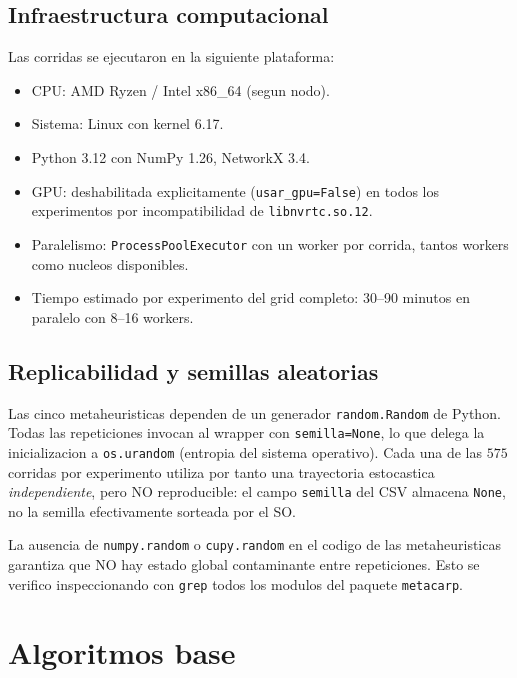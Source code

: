 \subsection{Infraestructura computacional}
\label{sec:infra}

Las corridas se ejecutaron en la siguiente plataforma:
\begin{itemize}
\item CPU: AMD Ryzen / Intel x86\_64 (segun nodo).
\item Sistema: Linux con kernel 6.17.
\item Python 3.12 con NumPy 1.26, NetworkX 3.4.
\item GPU: deshabilitada explicitamente (\texttt{usar\_gpu=False}) en
  todos los experimentos por incompatibilidad de \texttt{libnvrtc.so.12}.
\item Paralelismo: \texttt{ProcessPoolExecutor} con un worker por
  corrida, tantos workers como nucleos disponibles.
\item Tiempo estimado por experimento del grid completo: 30--90
  minutos en paralelo con 8--16 workers.
\end{itemize}

\subsection{Replicabilidad y semillas aleatorias}
\label{sec:semillas}

Las cinco metaheuristicas dependen de un generador \texttt{random.Random}
de Python. Todas las repeticiones invocan al wrapper con
\texttt{semilla=None}, lo que delega la inicializacion a
\texttt{os.urandom} (entropia del sistema operativo). Cada una de las
$575$ corridas por experimento utiliza por tanto una trayectoria
estocastica \emph{independiente}, pero NO reproducible: el campo
\texttt{semilla} del CSV almacena \texttt{None}, no la semilla
efectivamente sorteada por el SO.

La ausencia de \texttt{numpy.random} o \texttt{cupy.random} en el
codigo de las metaheuristicas garantiza que NO hay estado global
contaminante entre repeticiones. Esto se verifico inspeccionando con
\texttt{grep} todos los modulos del paquete \texttt{metacarp}.

\section{Algoritmos base}
\label{sec:algoritmos-base}


